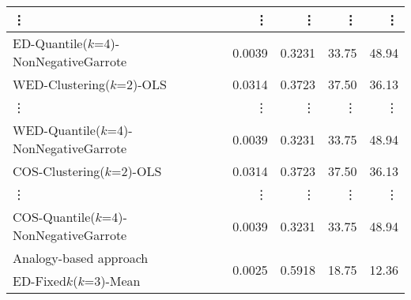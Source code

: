 \begin{table*}[ht]
\begin{tabular}{|l|r|r|r|r|}
        \vdots & \vdots & \vdots & \vdots & \vdots  \\ \hline
        ED-Quantile($k$=4)-NonNegativeGarrote & 0.0039  & 0.3231  & 33.75  & 48.94 \\ \hline
        WED-Clustering($k$=2)-OLS & 0.0314  & 0.3723  & 37.50  & 36.13 \\ \hline
        \vdots & \vdots & \vdots & \vdots & \vdots  \\ \hline
        WED-Quantile($k$=4)-NonNegativeGarrote & 0.0039  & 0.3231  & 33.75  & 48.94 \\ \hline
        COS-Clustering($k$=2)-OLS & 0.0314  & 0.3723  & 37.50  & 36.13 \\ \hline
        \vdots & \vdots & \vdots & \vdots & \vdots  \\ \hline
        COS-Quantile($k$=4)-NonNegativeGarrote & 0.0039  & 0.3231  & 33.75  & 48.94 \\ \hline
        Analogy-based approach & \multirow{2}{*}{0.0025} & \multirow{2}{*}{0.5918} & \multirow{2}{*}{18.75} & \multirow{2}{*}{12.36} \\
        ED-Fixed$k$($k$=3)-Mean &  &  &  &  \\ \hline
  \end{tabular}
\end{table*}
